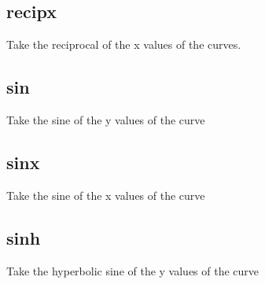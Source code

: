 \documentclass[letterpaper,10pt,english]{sphinxmanual}
\begin{document}
\subsection{recipx}
\label{\detokenize{math_operations:recipx}}
Take the reciprocal of the x values of the curves.

\begin{sphinxVerbatim}[commandchars=\\\{\}]
\PYG{p}{[}\PYG{p}{]}  
\end{sphinxVerbatim}


\subsection{sin}
\label{\detokenize{math_operations:sin}}
Take the sine of the y values of the curve

\begin{sphinxVerbatim}[commandchars=\\\{\}]
\PYG{p}{[}\PYG{p}{]}  
\end{sphinxVerbatim}


\subsection{sinx}
\label{\detokenize{math_operations:sinx}}
Take the sine of the x values of the curve

\begin{sphinxVerbatim}[commandchars=\\\{\}]
\PYG{p}{[}\PYG{p}{]}  
\end{sphinxVerbatim}


\subsection{sinh}
\label{\detokenize{math_operations:sinh}}
Take the hyperbolic sine of the y values of the curve

\begin{sphinxVerbatim}[commandchars=\\\{\}]
\PYG{p}{[}\PYG{p}{]}  
\end{sphinxVerbatim}
\end{document}
